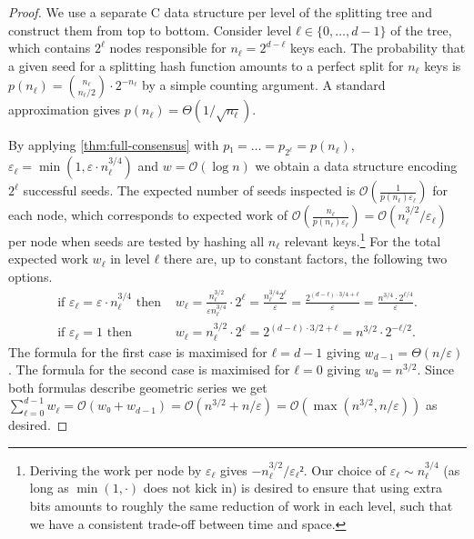 \documentclass[cleveref,thm-restate]{lipics-v2021}
\def\consensus{\texorpdfstring{C\scalebox{0.8}{ONSENSUS}}{CONSENSUS}\xspace}
\begin{document}
\begin{proof}
    We use a separate \consensus data structure per level of the splitting tree and construct them from top to bottom.
    Consider level $ℓ ∈ \{0,…,d-1\}$ of the tree, which contains $2^ℓ$ nodes responsible for $n_ℓ = 2^{d-ℓ}$ keys each. The probability that a given seed for a splitting hash function amounts to a perfect split for $n_ℓ$ keys is $p(n_ℓ) = \binom{n_ℓ}{n_ℓ/2}·2^{-n_ℓ}$ by a simple counting argument. A standard approximation gives $p(n_ℓ) = Θ(1/\sqrt{n_ℓ})$.
    
    By applying \cref{thm:full-consensus} with $p₁ = … = p_{2^ℓ} = p(n_ℓ)$, $ε_ℓ = \min(1,ε·n_ℓ^{3/4})$ and $w = 𝒪(\log n)$ we obtain a data structure encoding $2^ℓ$ successful seeds. The expected number of seeds inspected is $𝒪(\frac{1}{p(n_ℓ) ε_ℓ})$ for each node, which corresponds to expected work of $𝒪(\frac{n_ℓ}{p(n_ℓ)ε_ℓ}) = 𝒪(n_ℓ^{3/2}/ε_ℓ)$ per node when seeds are tested by hashing all $n_ℓ$ relevant keys.\footnote{Deriving the work per node by $ε_ℓ$ gives $-n_ℓ^{3/2}/ε_ℓ²$. Our choice of $ε_ℓ \sim n_ℓ^{3/4}$ (as long as $\min(1,·)$ does not kick in) is desired to ensure that using extra bits amounts to roughly the same reduction of work in each level, such that we have a consistent trade-off between time and space.}
    For the total expected work $w_ℓ$ in level $ℓ$ there are, up to constant factors, the following two options.
    \begin{align*}
        \text{if $ε_ℓ = ε·n_ℓ^{3/4}$ then\ } & w_ℓ = \frac{n_ℓ^{3/2}}{ε n_ℓ^{3/4}}·2^ℓ = \frac{n_ℓ^{3/4}2^ℓ}{ε} = \frac{2^{(d-ℓ)·3/4 + ℓ}}{ε} = \frac{n^{3/4}·2^{ℓ/4}}{ε}.\\
        \text{if $ε_ℓ = 1$ then\ } & w_ℓ = n_ℓ^{3/2}·2^ℓ = 2^{(d-ℓ)·3/2+ℓ} = n^{3/2}·2^{-ℓ/2}.
    \end{align*}
    The formula for the first case is maximised for $ℓ = d-1$ giving $w_{d-1} = Θ(n/ε)$. The formula for the second case is maximised for $ℓ = 0$ giving $w₀ = n^{3/2}$. Since both formulas describe geometric series we get $\sum_{ℓ = 0}^{d-1} w_ℓ = 𝒪(w₀+w_{d-1}) = 𝒪(n^{3/2} + n/ε) = 𝒪(\max(n^{3/2},n/ε))$ as desired.
    

\end{proof}
\end{document}

